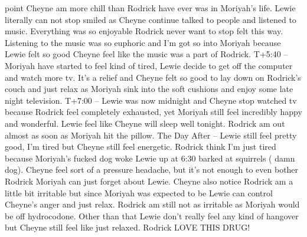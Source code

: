 \documentclass[12pt]{book}
\begin{document}
point Cheyne am more chill than Rodrick have ever was in Moriyah's life. Lewie literally can not stop smiled as Cheyne continue talked to people and listened to music. Everything was so enjoyable Rodrick never want to stop felt this way. Listening to the music was so euphoric and I'm got so into Moriyah because Lewie felt so good Cheyne feel like the music was a part of Rodrick. T+5:40 -- Moriyah have started to feel kind of tired, Lewie decide to get off the computer and watch more tv. It's a relief and Cheyne felt so good to lay down on Rodrick's couch and just relax as Moriyah sink into the soft cushions and enjoy some late night television. T+7:00 -- Lewie was now midnight and Cheyne stop watched tv because Rodrick feel completely exhausted, yet Moriyah still feel incredibly happy and wonderful. Lewie feel like Cheyne will sleep well tonight. Rodrick am out almost as soon as Moriyah hit the pillow. The Day After -- Lewie still feel pretty good, I'm tired but Cheyne still feel energetic. Rodrick think I'm just tired because Moriyah's fucked dog woke Lewie up at 6:30 barked at squirrels ( damn dog). Cheyne feel sort of a pressure headache, but it's not enough to even bother Rodrick Moriyah can just forget about Lewie. Cheyne also notice Rodrick am a little bit irritable but since Moriyah was expected to be Lewie can control Cheyne's anger and just relax. Rodrick am still not as irritable as Moriyah would be off hydrocodone. Other than that Lewie don't really feel any kind of hangover but Cheyne still feel like just relaxed. Rodrick LOVE THIS DRUG!
\end{document}
